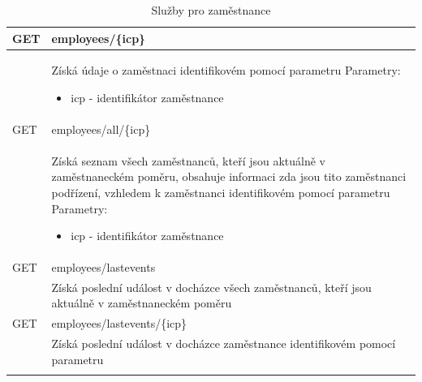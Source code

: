 \documentclass{diplomka}
\begin{document}
\begin{center}
\begin{longtable}[H]{| m{2cm} |  m{10cm} |}
\hline
\rowcolor{Gray}
GET  & employees/\{icp\} \\ \hline
&  \parbox{10cm}{\vspace{5 mm}Získá údaje o zaměstnaci identifikovém pomocí parametru\\
Parametry:\begin{itemize}[noitemsep,nolistsep]
\item icp - identifikátor zaměstnance
\end{itemize}
\vspace{5 mm}} \\ \hline
{}
GET  & employees/all/\{icp\} \\ \hline
&  \parbox{10cm}{\vspace{5 mm}Získá seznam všech zaměstnanců, kteří jsou aktuálně v zaměstnaneckém poměru, obsahuje informaci zda jsou tito zaměstnanci podřízení, vzhledem k zaměstnanci identifikovém pomocí parametru\\
Parametry:\begin{itemize}[noitemsep,nolistsep]
\item icp - identifikátor zaměstnance
\end{itemize}
\vspace{5 mm}} \\ \hline
{}
GET  & employees/lastevents \\ 
&  \parbox{10cm}{\vspace{5 mm}Získá poslední událost v docházce všech zaměstnanců, kteří jsou aktuálně v zaměstnaneckém poměru
\vspace{5 mm}}\\
\hline
{}
GET  & employees/lastevents/\{icp\} \\ 
&  \parbox{10cm}{\vspace{5 mm}Získá poslední událost v docházce zaměstnance identifikovém pomocí parametru
\vspace{5 mm}}\\
\hline
\caption{Služby pro zaměstnance}
\label{tab:uriemps}
\end{longtable}
\end{center}
\end{document}
